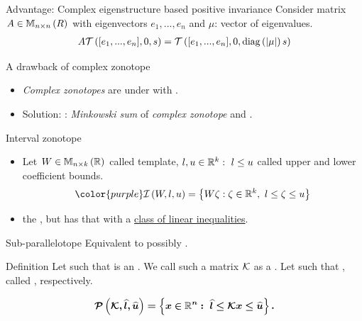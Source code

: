 \begin{frame}{Advantage: Complex eigenstructure based positive invariance}
Consider {\color{blue} matrix $A\in\mathbb{M}_{n\times n}\left(R\right)$} with {\color{blue} eigenvectors $e_1,...,e_n$}
and {\color{blue} $\mu$: vector of eigenvalues}.
%
{\color{purple}
\begin{align*}
 A\mathit{\operatorname{\mathcal{T}}}\left([e_1,...,e_n],0,s\right)   = \mathit{\operatorname{\mathcal{T}}}\left([e_1,...,e_n],0,\operatorname{diag}\left(\left|\mu\right|\right)s\right)
\end{align*}
}
%
\end{frame}

\begin{frame}{A drawback of complex zonotope}
%
\begin{itemize}
\item {\it Complex zonotopes} are  under  with
.
\pause
\item
Solution:
: {\it Minkowski sum} of {\it complex
zonotope} and .
\end{itemize}
%
\end{frame}

\begin{frame}{Interval zonotope}
%
\begin{itemize}
\item Let {\color{purple} $W\in\mathbb{M}_{n\times k}\left(\mathbb{R}\right)$} called {\color{blue}
template}, {\color{purple} $l,u\in\mathbb{R}^k:~l\leq u$} called
{\color{blue} upper and lower coefficient bounds}.
%
\[
{\color{purple}
\iztope{W}{l}{u}=\set{W\zeta:\zeta\in\reals^k,~l\leq \zeta\leq u}
}
\]
\item {} the , but has  that  with
a \underline{class of linear inequalities}.
\end{itemize}
%
\end{frame}

\begin{frame}{Sub-parallelotope}
Equivalent to possibly .
%
\begin{block}{Definition}
Let  such that
\eqncol{$\lt(\qtemp\transpose{\qtemp}\rt)$} is an .  We
call such a matrix $\mathcal{K}$ as a .
Let  such that
\eqncol{$\plb\leq\pub$}, called , respectively.
%

\[\bm{
\mathcal{P}\left(\mathcal{K},\widehat{l},\widehat{u}\right)=\left\{x\in\mathbb{R}^n:~\widehat{l}\leq\mathcal{K} x\leq\widehat{u}\right\}.
}
\]
%
\end{block}
%
\end{frame}

